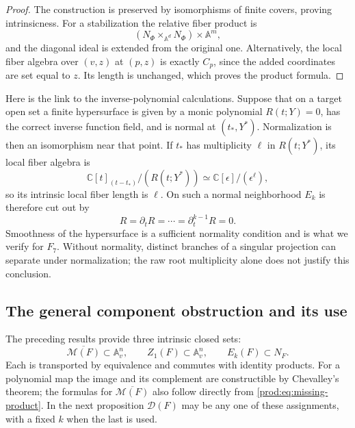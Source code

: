 \documentclass[11pt]{article}
\numberwithin{equation}{section}
\theoremstyle{plain}
\theoremstyle{definition}
\theoremstyle{remark}
\newcommand{\C}{\mathbb{C}}
\newcommand{\A}{\mathbb{A}}
\newcommand{\Miss}{\mathcal M}
\begin{document}
\begin{proof}
The construction is preserved by isomorphisms of finite covers, proving
intrinsicness. For a stabilization the relative fiber product is
\[
 (N_\Phi\times_{\A^d}N_\Phi)\times\A^m,
\]
and the diagonal ideal is extended from the original one. Alternatively,
the local fiber algebra over $(v,z)$ at $(p,z)$ is exactly $C_p$, since
the added coordinates are set equal to $z$. Its length is unchanged,
which proves the product formula.
\end{proof}

Here is the link to the inverse-polynomial calculations. Suppose that on
a target open set a finite hypersurface is given by a monic polynomial
$R(t;Y)=0$, has the correct inverse function field, and is normal at
$(t_*,Y^*)$. Normalization is then an isomorphism near that point. If
$t_*$ has multiplicity $\ell$ in $R(t;Y^*)$, its local fiber algebra is
\[
 \C[t]_{(t-t_*)}/(R(t;Y^*))
 \simeq\C[\epsilon]/(\epsilon^\ell),
\]
so its intrinsic local fiber length is $\ell$. On such a normal neighborhood
$E_k$ is therefore cut out by
\[
 R=\partial_tR=\cdots=\partial_t^{k-1}R=0.
\]
Smoothness of the hypersurface is a sufficient normality condition and is
what we verify for $F_7$. Without normality, distinct branches of a singular
projection can separate under normalization; the raw root multiplicity
alone does not justify this conclusion.

\subsection{The general component obstruction and its use}
The preceding results provide three intrinsic closed sets:
\[
 \overline{\Miss(F)}\subset\A^n_v,\qquad
 Z_1(F)\subset\A^n_v,\qquad E_k(F)\subset N_F.
\]
Each is transported by equivalence and commutes with identity products.
For a polynomial map the image and its complement are constructible by
Chevalley's theorem; the formulas for $\overline{\Miss(F)}$ also follow
directly from \eqref{prod:eq:missing-product}. In the next proposition
$\mathcal D(F)$ may be any one of these assignments, with a fixed $k$
when the last is used.
\end{document}
